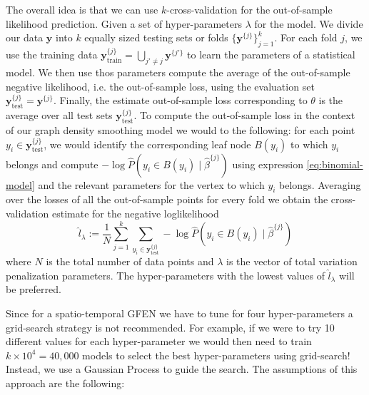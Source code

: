 \documentclass[a4paper, 11pt]{article}
\begin{document}
The overall idea is that we can use $k$-cross-validation for the out-of-sample likelihood prediction. Given a set of hyper-parameters $\lambda$ for the model. We divide our data $\mathbf{y}$ into $k$ equally sized testing sets or folds $\{\mathbf{y}^{\{j\}}\}_{j=1}^k$. For each fold $j$, we use the training data $\mathbf{y}^{\{j\}}_\text{train} = \bigcup_{j' \neq j} \mathbf{y}^{\{j'\}}$ to learn the parameters of a statistical model. We then use thos parameters compute the average of the out-of-sample negative likelihood, i.e. the out-of-sample loss, using the evaluation set $\mathbf{y}^{\{j\}}_\text{test} = \mathbf{y}^{\{j\}}$. Finally, the estimate out-of-sample loss corresponding to $\theta$ is the average over all test sets $\mathbf{y}^{\{j\}}_\text{test}$. To compute the out-of-sample loss in the context of our graph density smoothing model we would to the following: for each point $y_i \in \mathbf{y}^{\{j\}}_\text{test}$, we would identify the corresponding leaf node $B(y_i)$ to which $y_i$ belongs and compute $-\log \hat{P}(y_i \in B(y_i) \mid \hat{\beta}^{\{j\}})$ using expression \eqref{eq:binomial-model} and the relevant parameters for the vertex to which $y_i$ belongs. Averaging over the losses of all the out-of-sample points for every fold we obtain the cross-validation estimate for the negative loglikelihood
\begin{equation}\label{eq:negll}
\hat{l}_\lambda := \frac{1}{N} \sum_{j=1}^k \sum_{y_i \in \mathbf{y}^{\{j\}}_\text{test}} -\log \hat{P}(y_i \in B(y_i) \mid \hat{\beta}^{\{j\}})
\end{equation}
where $N$ is the total number of data points and $\lambda$ is the vector of total variation penalization parameters. The hyper-parameters with the lowest values of $\hat{l}_\lambda$ will be preferred.

Since for a spatio-temporal GFEN we have to tune for four hyper-parameters a grid-search strategy is not recommended. For example, if we were to try 10 different values for each hyper-parameter we would then need to train $k \times 10^4 = 40,000$ models to select the best hyper-parameters using grid-search! Instead, we use a Gaussian Process \citep{snoek-etal-2012} to guide the search. The assumptions of this approach are the following:
\end{document}
